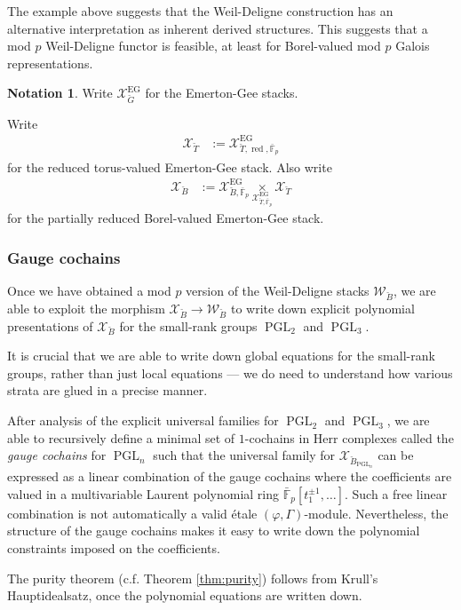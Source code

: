 \documentclass[11pt]{amsart}
\theoremstyle{definition}
\newtheorem{notation}[thm]{Notation}
\newcommand{\bFp}{\bar{\mathbb{F}}_p}
\newcommand{\cX}{\mathcal{X}}
\newcommand{\cW}{\mathcal{W}}
\newcommand{\bG}{\breve{G}}
\newcommand{\bB}{\breve{B}}
\newcommand{\bT}{\breve{T}}
\DeclareMathOperator{\PGL}{PGL}
\DeclareMathOperator{\EG}{EG}
\DeclareMathOperator{\red}{red}
\begin{document}
The example above suggests that
the Weil-Deligne construction
has an alternative interpretation
as inherent derived structures.
This suggests that
a mod $p$ Weil-Deligne functor
is feasible,
at least for Borel-valued
mod $p$ Galois representations.

\begin{notation}
Write
$\cX_{\bG}^{\EG}$ for the Emerton-Gee stacks.

Write
\begin{align*}
\cX_{\bT} & := \cX_{\bT, \red, \bFp}^{\EG}
\end{align*}
for the reduced torus-valued
Emerton-Gee stack.
Also write
\begin{align*}
\cX_{\bB} & := \cX_{\bB,\bFp}^{\EG}\underset{\cX_{\bT,\bFp}^{\EG}}{\times}
\cX_{\bT}
\end{align*}
for the partially reduced Borel-valued Emerton-Gee stack.
\end{notation}

\subsubsection{Gauge cochains}
Once we have obtained a mod $p$ version
of the Weil-Deligne stacks
$\cW_{\bB}$,
we are able to 
exploit the morphism
$\cX_{\bB}\to \cW_{\bB}$
to write down explicit polynomial
presentations of
$\cX_{\bB}$ for the small-rank groups $\PGL_2$
and $\PGL_3$.

It is crucial that we are able to write down
global equations for the small-rank groups,
rather than just local equations
--- we do need to understand how
various strata are glued in a precise manner.


After analysis of the explicit universal families
for $\PGL_2$ and $\PGL_3$,
we are able to recursively define a minimal set
of $1$-cochains in Herr complexes
called the {\it gauge cochains}
for $\PGL_n$
such that
the universal family for $\cX_{\bB_{\PGL_n}}$
can be expressed
as a linear combination of the gauge cochains
where the coefficients
are valued in a multivariable Laurent polynomial ring
$\bFp[t_1^{\pm1}, \dots]$.
Such a free linear combination is not automatically
a valid \'etale $(\varphi, \Gamma)$-module.
Nevertheless, the structure of the gauge cochains
makes it easy to write down the polynomial constraints
imposed on the coefficients.

The purity theorem (c.f. Theorem \ref{thm:purity})
follows from
Krull's Hauptidealsatz,
once the polynomial equations are written down.
\end{document}

